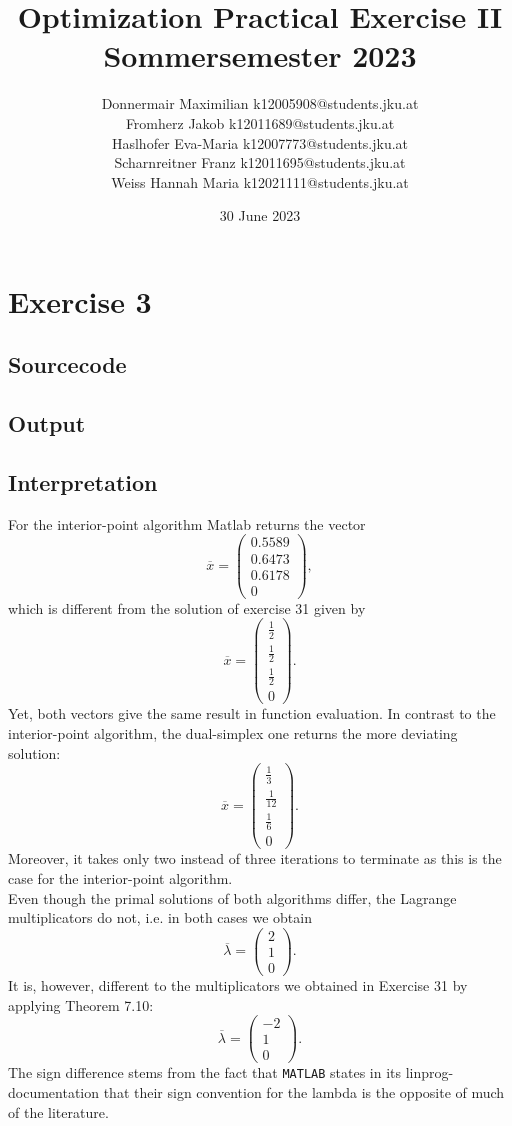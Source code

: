 \documentclass{article}
\title{Optimization Practical Exercise II\\ Sommersemester 2023}
\author{Donnermair Maximilian k12005908@students.jku.at\\ Fromherz Jakob k12011689@students.jku.at\\Haslhofer Eva-Maria  k12007773@students.jku.at \\ Scharnreitner Franz k12011695@students.jku.at\\ Weiss Hannah Maria k12021111@students.jku.at } %
\date{30 June 2023}
\begin{document}
	\maketitle
	
	\newpage
	
	\section{Exercise 3}
	\subsection{Sourcecode}
	
	\subsection{Output}
	
	\subsection{Interpretation}
	For the interior-point algorithm Matlab returns the vector
	$$ \overline{x} = \begin{pmatrix}
		0.5589\\
		0.6473\\
		0.6178\\
		0
	\end{pmatrix},$$
	which is different from the solution of exercise 31 given by
	$$\overline{x} = \begin{pmatrix}
	\frac{1}{2}\\
	\frac{1}{2}\\
	\frac{1}{2}\\
	0
	\end{pmatrix}.$$
	Yet, both vectors give the same result in function evaluation. In contrast to the interior-point algorithm, the dual-simplex one returns the more deviating solution: 
	$$\overline{x} = \begin{pmatrix}
	\frac{1}{3}\\
	\frac{1}{12}\\
	\frac{1}{6}\\
	0
	\end{pmatrix}.$$
	Moreover, it takes only two instead of three iterations to terminate as this is the case for the interior-point algorithm.\\
	Even though the primal solutions of both algorithms differ, the Lagrange multiplicators do not, i.e. in both cases we obtain
	$$ \overline{\lambda} = \begin{pmatrix}
	2\\
	1\\
	0
	\end{pmatrix}.$$
    It is, however, different to the multiplicators we obtained in Exercise 31 by applying Theorem 7.10:
    $$ \overline{\lambda} = \begin{pmatrix}
	-2\\
	1\\
	0
	\end{pmatrix}.$$
	The sign difference stems from the fact that \texttt{MATLAB} states in its linprog-documentation that their sign convention for the lambda is the opposite of much of the literature.
	
\end{document}
